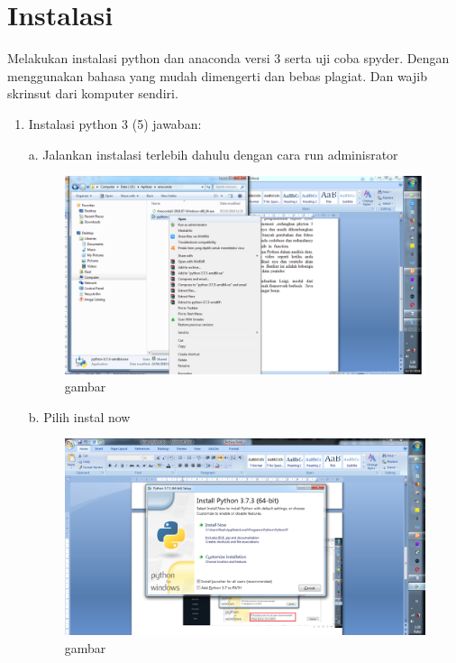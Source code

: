 \section{Instalasi}
Melakukan instalasi python dan anaconda versi 3 serta uji coba spyder. Dengan menggunakan bahasa yang mudah dimengerti dan bebas plagiat. 
Dan wajib skrinsut dari komputer sendiri.
\begin{enumerate}
\item
Instalasi python 3 (5)
jawaban:

a.	Jalankan instalasi terlebih dahulu dengan cara run adminisrator
    

    \begin{figure}
\begin{center} 
\includegraphics[scale=0.4]{src/soal1phyton1.PNG} 
\caption{gambar} 
\label{unhas} 
\end{center} 
\end{figure}

b. 	Pilih instal now

\begin{figure}
\begin{center} 
\includegraphics[scale=0.4]{src/soal1phyton2.PNG} 
\caption{gambar} 
\label{unhas} 
\end{center} 
\end{figure}


\end{enumerate}
